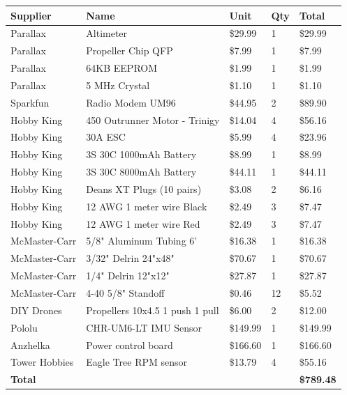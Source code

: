 \documentclass{article}
\numberwithin{equation}{section} %
\begin{document}
\begin{longtable}{l l l l l}
	\textbf{Supplier}		&	\textbf{Name}	&	\textbf{Unit}	&	\textbf{Qty}	&	\textbf{Total}		 \\
	\hline
	Parallax		&	Altimeter	&	\$29.99	&	1	&	\$29.99		 \\
	\hline
	Parallax		&	Propeller Chip QFP	&	\$7.99	&	1	&	\$7.99		 \\
	\hline
	Parallax		&	64KB EEPROM	&	\$1.99	&	1	&	\$1.99		 \\
	\hline
	Parallax		&	5 MHz Crystal	&	\$1.10	&	1	&	\$1.10		 \\
	\hline
	Sparkfun		&	Radio Modem UM96	&	\$44.95	&	2	&	\$89.90		 \\
	\hline
	Hobby King		&	450 Outrunner Motor - Trinigy	&	\$14.04	&	4	&	\$56.16		 \\
	\hline
	Hobby King		&	30A ESC	&	\$5.99	&	4	&	\$23.96		 \\
	\hline
	Hobby King		&	3S 30C 1000mAh Battery	&	\$8.99	&	1	&	\$8.99		 \\
	\hline
	Hobby King		&	3S 30C 8000mAh Battery	&	\$44.11	&	1	&	\$44.11		 \\
	\hline
	Hobby King		&	Deans XT Plugs (10 pairs)	&	\$3.08	&	2	&	\$6.16		 \\
	\hline
	Hobby King		&	12 AWG 1 meter wire Black	&	\$2.49	&	3	&	\$7.47		 \\
	\hline
	Hobby King		&	12 AWG 1 meter wire Red	&	\$2.49	&	3	&	\$7.47		 \\
	\hline
	McMaster-Carr	&	5/8" Aluminum Tubing 6'	&	\$16.38	&	1	&	\$16.38		 \\
	\hline
	McMaster-Carr	&	3/32" Delrin 24"x48"	&	\$70.67	&	1	&	\$70.67		 \\
	\hline
	McMaster-Carr	&	1/4" Delrin 12"x12"	&	\$27.87	&	1	&	\$27.87		 \\
	\hline
	McMaster-Carr	&	4-40 5/8" Standoff	&	\$0.46	&	12	&	\$5.52		 \\
	\hline
	DIY Drones		&	Propellers 10x4.5 1 push 1 pull	&	\$6.00	&	2	&	\$12.00		 \\
	\hline
	Pololu			&	CHR-UM6-LT IMU Sensor	&	\$149.99	&	1	&	\$149.99		 \\
	\hline
	Anzhelka		&	Power control board	&	\$166.60	&	1	&	\$166.60		 \\
	\hline
	Tower Hobbies	&	Eagle Tree RPM sensor	&	\$13.79	&	4	&	\$55.16		 \\
	\hline
	\textbf{Total}	&		&		&		&	\textbf{\$789.48}
\end{longtable}
\end{document}
